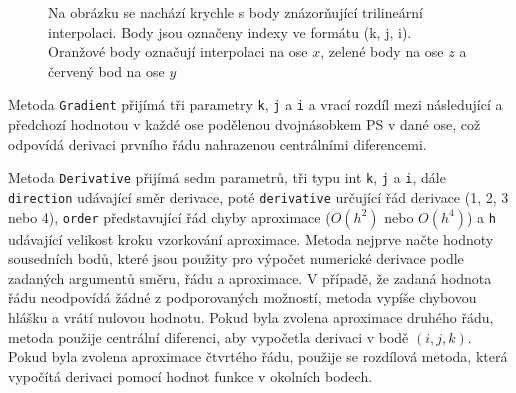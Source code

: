 \begin{figure}[ht]
	\centering
	\caption[Trilineární interpolace]{Na obrázku se nachází krychle s body znázorňující trilineární interpolaci. Body jsou označeny indexy ve formátu (k, j, i). Oranžové body označují interpolaci na ose $x$, zelené body na ose $z$ a červený bod na ose $y$}
	\label{trilinear-interpolation-cube}
\end{figure}

Metoda \verb|Gradient| přijímá tři parametry \verb|k|, \verb|j| a \verb|i| a vrací rozdíl mezi následující a předchozí hodnotou v každé ose podělenou dvojnásobkem PS v dané ose, což odpovídá derivaci prvního řádu nahrazenou centrálními diferencemi.

Metoda \verb|Derivative| přijímá sedm parametrů, tři typu int \verb|k|, \verb|j| a \verb|i|, dále \verb|direction| udávající směr derivace, poté \verb|derivative| určující řád derivace (1, 2, 3 nebo 4), \verb|order| představující řád chyby aproximace ($O(h^2)$ nebo $O(h^4)$) a \verb|h| udávající velikost kroku vzorkování aproximace. Metoda nejprve načte hodnoty sousedních bodů, které jsou použity pro výpočet numerické derivace podle zadaných argumentů směru, řádu a aproximace. V případě, že zadaná hodnota řádu neodpovídá žádné z podporovaných možností, metoda vypíše chybovou hlášku a vrátí nulovou hodnotu. Pokud byla zvolena aproximace druhého řádu, metoda použije centrální diferenci, aby vypočetla derivaci v bodě $(i, j, k)$. Pokud byla zvolena aproximace čtvrtého řádu, použije se rozdílová metoda, která vypočítá derivaci pomocí hodnot funkce v okolních bodech.

